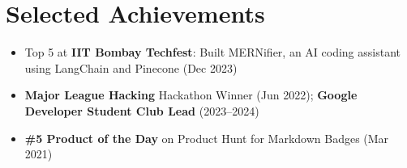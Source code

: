 \documentclass[letterpaper,10pt]{article}
\begin{document}
\section{Selected Achievements}
\begin{itemize}[leftmargin=0.15in, label=\textbullet]\small
  \item Top 5 at \textbf{IIT Bombay Techfest}: Built MERNifier, an AI coding assistant using LangChain and Pinecone (Dec 2023)
  \item \textbf{Major League Hacking} Hackathon Winner (Jun 2022); \textbf{Google Developer Student Club Lead} (2023--2024)
  \item \textbf{\#5 Product of the Day} on Product Hunt for Markdown Badges (Mar 2021)
\end{itemize}
\end{document}
